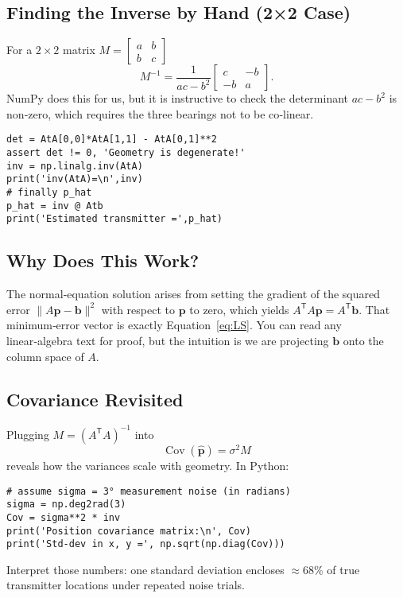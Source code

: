 \documentclass[11pt]{article}
\begin{document}
\subsection{Finding the Inverse by Hand (2×2 Case)}
For a $2\times2$ matrix $M=\begin{bmatrix}a&b\\b&c\end{bmatrix}$
\[
  M^{-1}=\frac{1}{ac-b^2}\begin{bmatrix}c&-b\\-b&a\end{bmatrix}.
\]
NumPy does this for us, but it is instructive to check the determinant $ac-b^2$ is non‑zero, which requires the three bearings not to be co‑linear.

\begin{verbatim}
det = AtA[0,0]*AtA[1,1] - AtA[0,1]**2
assert det != 0, 'Geometry is degenerate!'
inv = np.linalg.inv(AtA)
print('inv(AtA)=\n',inv)
# finally p_hat
p_hat = inv @ Atb
print('Estimated transmitter =',p_hat)
\end{verbatim}

\subsection{Why Does This Work?}
The normal‑equation solution arises from setting the gradient of the squared error $\lVert A\mathbf p-\mathbf b\rVert^2$ with respect to $\mathbf p$ to zero, which yields $A^{\mathsf T}A\mathbf p=A^{\mathsf T}\mathbf b$.  That minimum‑error vector is exactly Equation~\eqref{eq:LS}.  You can read any linear‑algebra text for proof, but the intuition is we are projecting $\mathbf b$ onto the column space of $A$.

\subsection{Covariance Revisited}
Plugging $M=(A^{\mathsf T}A)^{-1}$ into
\[
  \operatorname{Cov}(\hat{\mathbf p}) = \sigma^2 M
\]
reveals how the variances scale with geometry.  In Python:
\begin{verbatim}
# assume sigma = 3° measurement noise (in radians)
sigma = np.deg2rad(3)
Cov = sigma**2 * inv
print('Position covariance matrix:\n', Cov)
print('Std‑dev in x, y =', np.sqrt(np.diag(Cov)))
\end{verbatim}
Interpret those numbers: one standard deviation encloses $\approx68\%$ of true transmitter locations under repeated noise trials.
\end{document}
